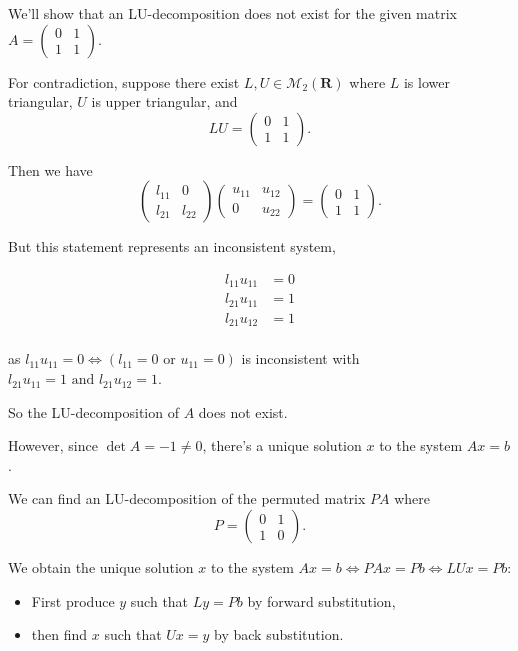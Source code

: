 \documentclass[titlepage,11pt]{article}
\providecommand{\tightlist}{%
      \setlength{\itemsep}{0pt}\setlength{\parskip}{0pt}}
\begin{document}
We'll show that an LU-decomposition does not exist for the given matrix
\(A = \begin{pmatrix} 0 & 1\\ 1 & 1 \end{pmatrix}.\)

For contradiction, suppose there exist
\(L, U \in \mathcal{M}_2(\mathbf{R})\) where \(L\) is lower triangular,
\(U\) is upper triangular, and
\[LU = \begin{pmatrix} 0 & 1\\ 1 & 1 \end{pmatrix}.\]

Then we have \[\begin{pmatrix}
  l_{11} & 0\\ l_{21} & l_{22}
  \end{pmatrix}
  \begin{pmatrix}
  u_{11} & u_{12}\\ 0 & u_{22}
  \end{pmatrix}
  = 
  \begin{pmatrix}
  0 & 1\\ 1 & 1
  \end{pmatrix}.\]

But this statement represents an inconsistent system,

\begin{align}
  l_{11}u_{11} &= 0\\
  l_{21}u_{11} &= 1\\
  l_{21}u_{12} &= 1\\
\end{align}

as \(l_{11}u_{11} = 0 \iff (l_{11} = 0 \text{ or } u_{11} = 0)\) is
inconsistent with \(l_{21}u_{11} = 1 \text{ and } l_{21}u_{12} = 1\).

So the LU-decomposition of \(A\) does not exist.

However, since \(\det A = -1 \neq 0\), there's a unique solution \(x\)
to the system \(Ax = b\).

We can find an LU-decomposition of the permuted matrix \(PA\) where
\[P = \begin{pmatrix} 0 &1 \\ 1 & 0\end{pmatrix}.\]

We obtain the unique solution \(x\) to the system
\(Ax = b \iff PAx = Pb \iff LUx = Pb\):

\begin{itemize}
\tightlist
\item
  First produce \(y\) such that \(Ly = Pb\) by forward substitution,
\item
  then find \(x\) such that \(Ux = y\) by back substitution.
\end{itemize}
\end{document}
